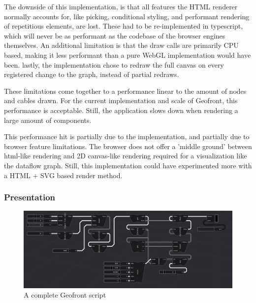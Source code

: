 The downside of this implementation, is that all features the HTML renderer normally accounts for, like picking, conditional styling, and performant rendering of repetitious elements, are lost.
These had to be re-implemented in typescript, which will never be as performant as the codebase of the browser engines themselves. 
An additional limitation is that the draw calls are primarily CPU based, 
making it less performant than a pure WebGL implementation would have been.
lastly, the implementation chose to redraw the full canvas on every registered change to the graph, instead of partial redraws. 

These limitations come together to a performance linear to the amount of nodes and cables drawn. For the current implementation and scale of Geofront, this performance is acceptable.  
Still, the application slows down when rendering a large amount of components. 




This performance hit is partially due to the implementation, and partially due to browser feature limitations. 
The browser does not offer a 'middle ground' between html-like rendering and 2D canvas-like rendering required for a visualization like the dataflow graph. 
Still, this implementation could have experimented more with a HTML + SVG based render method.

\subsubsection*{Presentation}

\begin{figure}
  \centering
  \graphicspath{ {../../assets/images/implementation/} }
  \includegraphics[width=\linewidth]{a-full-graph.png}
  \caption[Shim Classes]{A complete Geofront script}
  \label{fig:a-full-graph}
\end{figure}

